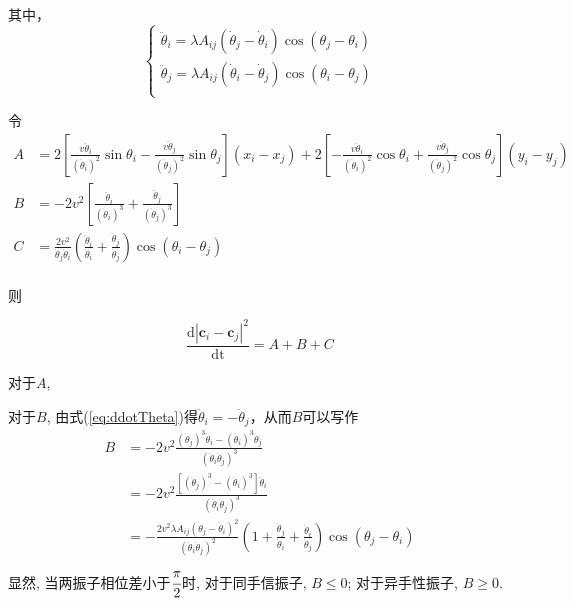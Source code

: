 \documentclass{article}
\begin{document}
其中，
\begin{equation}\label{eq:ddotTheta}
    \begin{cases}
        \ddot{\theta}_i=\lambda A_{ij}\left( \dot{\theta}_j-\dot{\theta}_i \right) \cos \left( \theta _j-\theta _i \right)\\
        \ddot{\theta}_j=\lambda A_{ij}\left( \dot{\theta}_i-\dot{\theta}_j \right) \cos \left( \theta _i-\theta _j \right)\\
    \end{cases}
\end{equation}

令$$
\begin{aligned}
	A&=2\left[ \frac{v\ddot{\theta}_i}{\left( \dot{\theta}_i \right) ^2}\sin \theta _i-\frac{v\ddot{\theta}_j}{\left( \dot{\theta}_j \right) ^2}\sin \theta _j \right] \left( x_i-x_j \right) +2\left[ -\frac{v\ddot{\theta}_i}{\left( \dot{\theta}_i \right) ^2}\cos \theta _i+\frac{v\ddot{\theta}_j}{\left( \dot{\theta}_j \right) ^2}\cos \theta _j \right] \left( y_i-y_j \right)\\
	B&=-2v^2\left[ \frac{\ddot{\theta}_i}{\left( \dot{\theta}_i \right) ^3}+\frac{\ddot{\theta}_j}{\left( \dot{\theta}_j \right) ^3} \right]\\
	C&=\frac{2v^2}{\dot{\theta}_j\dot{\theta}_i}\left( \frac{\ddot{\theta}_i}{\dot{\theta}_i}+\frac{\ddot{\theta}_j}{\dot{\theta}_j} \right) \cos \left( \theta _i-\theta _j \right)\\
\end{aligned}
$$



则

$$
\frac{\mathrm{d}\left| \mathbf{c}_i-\mathbf{c}_j \right|^2}{\mathrm{dt}}=A+B+C
$$

对于$A$,

对于$B$, 由式(\ref{eq:ddotTheta})得$\ddot{\theta}_i=-\ddot{\theta}_j$，从而$B$可以写作
$$
\begin{aligned}
	B&=-2v^2\frac{\left( \dot{\theta}_j \right) ^3\ddot{\theta}_i-\left( \dot{\theta}_i \right) ^3\ddot{\theta}_j}{\left( \dot{\theta}_i\dot{\theta}_j \right) ^3}\\
	&=-2v^2\frac{\left[ \left( \dot{\theta}_j \right) ^3-\left( \dot{\theta}_i \right) ^3 \right] \ddot{\theta}_i}{\left( \dot{\theta}_i\dot{\theta}_j \right) ^3}\\
	&=-\frac{2v^2\lambda A_{ij}\left( \dot{\theta}_j-\dot{\theta}_i \right) ^2}{\left( \dot{\theta}_i\dot{\theta}_j \right) ^2}\left( 1+\frac{\dot{\theta}_j}{\dot{\theta}_i}+\frac{\dot{\theta}_i}{\dot{\theta}_j} \right) \cos \left( \theta _j-\theta _i \right)\\
\end{aligned}
$$
显然, 当两振子相位差小于$\cfrac{\pi}{2}$时, 对于同手信振子, $B\leqslant0$; 对于异手性振子, $B\geqslant0$.
\end{document}
